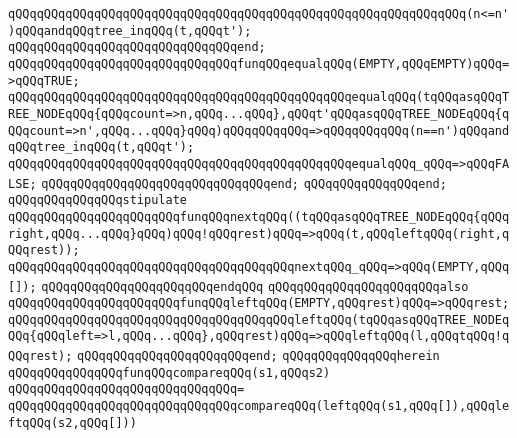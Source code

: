 \verb|qQQqqQQqqQQqqQQqqQQqqQQqqQQqqQQqqQQqqQQqqQQqqQQqqQQqqQQqqQQqqQQq(n<=n')qQQqandqQQqtree_inqQQq(t,qQQqt');|\newline
\verb|qQQqqQQqqQQqqQQqqQQqqQQqqQQqqQQqend;|\newline
\newline
\verb|qQQqqQQqqQQqqQQqqQQqqQQqqQQqqQQqfunqQQqequalqQQq(EMPTY,qQQqEMPTY)qQQq=>qQQqTRUE;|\newline
\verb|qQQqqQQqqQQqqQQqqQQqqQQqqQQqqQQqqQQqqQQqqQQqqQQqequalqQQq(tqQQqasqQQqTREE_NODEqQQq{qQQqcount=>n,qQQq...qQQq},qQQqt'qQQqasqQQqTREE_NODEqQQq{qQQqcount=>n',qQQq...qQQq}qQQq)qQQqqQQqqQQq=>qQQqqQQqqQQq(n==n')qQQqandqQQqtree_inqQQq(t,qQQqt');|\newline
\verb|qQQqqQQqqQQqqQQqqQQqqQQqqQQqqQQqqQQqqQQqqQQqqQQqequalqQQq_qQQq=>qQQqFALSE;|\newline
\verb|qQQqqQQqqQQqqQQqqQQqqQQqqQQqqQQqend;|\newline
\verb|qQQqqQQqqQQqqQQqend;|\newline
\newline
\verb|qQQqqQQqqQQqqQQqstipulate|\newline
\newline
\verb|qQQqqQQqqQQqqQQqqQQqqQQqfunqQQqnextqQQq((tqQQqasqQQqTREE_NODEqQQq{qQQqright,qQQq...qQQq}qQQq)qQQq!qQQqrest)qQQq=>qQQq(t,qQQqleftqQQq(right,qQQqrest));|\newline
\verb|qQQqqQQqqQQqqQQqqQQqqQQqqQQqqQQqqQQqqQQqnextqQQq_qQQq=>qQQq(EMPTY,qQQq[]);|\newline
\verb|qQQqqQQqqQQqqQQqqQQqqQQqendqQQq|\newline
\newline
\verb|qQQqqQQqqQQqqQQqqQQqqQQqalso|\newline
\verb|qQQqqQQqqQQqqQQqqQQqqQQqfunqQQqleftqQQq(EMPTY,qQQqrest)qQQq=>qQQqrest;|\newline
\verb|qQQqqQQqqQQqqQQqqQQqqQQqqQQqqQQqqQQqqQQqleftqQQq(tqQQqasqQQqTREE_NODEqQQq{qQQqleft=>l,qQQq...qQQq},qQQqrest)qQQq=>qQQqleftqQQq(l,qQQqtqQQq!qQQqrest);|\newline
\verb|qQQqqQQqqQQqqQQqqQQqqQQqend;|\newline
\newline
\verb|qQQqqQQqqQQqqQQqherein|\newline
\verb|qQQqqQQqqQQqqQQqfunqQQqcompareqQQq(s1,qQQqs2)|\newline
\verb|qQQqqQQqqQQqqQQqqQQqqQQqqQQqqQQq=|\newline
\verb|qQQqqQQqqQQqqQQqqQQqqQQqqQQqqQQqcompareqQQq(leftqQQq(s1,qQQq[]),qQQqleftqQQq(s2,qQQq[]))|\newline
